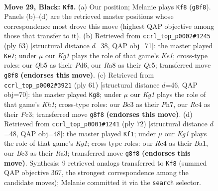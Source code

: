 \documentclass[11pt]{article}
\begin{document}
\clearpage

\begin{figure}[p]\centering
\begin{subfigure}{0.46\textwidth}\centering
\resizebox{\linewidth}{!}{%
\newchessgame
\chessboard[
  setfen={r5k1/p7/4p1Q1/pq1p4/2rP2P1/2b5/2P5/3K2R1 b - - 0 29},
  showmover=false,
  pgfstyle=straightmove, color=movearrow, markmove={g8-f8}
]}
\caption{}
\end{subfigure}\hfill
\begin{subfigure}{0.46\textwidth}\centering
\resizebox{\linewidth}{!}{%
\newchessgame
\chessboard[
  setfen={4k1Q1/8/p2p4/1pr1q1p1/6Pb/8/PPP5/1K5R b - - 2 32},
  showmover=false,
  pgfstyle=straightmove, color=movearrow, markmove={e8-e7}
]}
\caption{}
\end{subfigure}
\\[4pt]
\begin{subfigure}{0.46\textwidth}\centering
\resizebox{\linewidth}{!}{%
\newchessgame
\chessboard[
  setfen={3r3k/p1q4p/5Q2/2p1P3/P6P/2pP4/6P1/R3K3 b Q - 0 31},
  showmover=false,
  pgfstyle=straightmove, color=movearrow, markmove={h8-g8}
]}
\caption{}
\end{subfigure}\hfill
\begin{subfigure}{0.46\textwidth}\centering
\resizebox{\linewidth}{!}{%
\newchessgame
\chessboard[
  setfen={1r4k1/6pp/5p2/2p5/2P3q1/R3Pb2/3Q3P/B3R1K1 w - - 0 37},
  showmover=false,
  pgfstyle=straightmove, color=movearrow, markmove={g1-f1}
]}
\caption{}
\end{subfigure}
\caption{\textbf{Move 29, Black: \texttt{Kf8}.} (a) Our position; Melanie plays \texttt{Kf8} (\texttt{g8f8}). Panels (b)--(d) are the retrieved master positions whose correspondence most drove this move (highest QAP objective among those that transfer to it). (b) Retrieved from \texttt{ccrl\_top\_p0002\#1245} (ply 63) [structural distance $d$=38, QAP obj=71]: the master played \texttt{Ke7}; under $\mu$ our \emph{Kg1} plays the role of that game's \emph{Ke1}; cross-type roles: our \emph{Q}b5 as their \emph{P}d6, our \emph{R}a8 as their \emph{Q}e5; transferred move \texttt{g8f8} \textbf{(endorses this move)}. (c) Retrieved from \texttt{ccrl\_top\_p0002\#3921} (ply 61) [structural distance $d$=46, QAP obj=70]: the master played \texttt{Kg8}; under $\mu$ our \emph{Kg1} plays the role of that game's \emph{Kh1}; cross-type roles: our \emph{B}c3 as their \emph{P}h7, our \emph{R}c4 as their \emph{P}c3; transferred move \texttt{g8f8} \textbf{(endorses this move)}. (d) Retrieved from \texttt{ccrl\_top\_p0001\#1241} (ply 72) [structural distance $d$=48, QAP obj=48]: the master played \texttt{Kf1}; under $\mu$ our \emph{Kg1} plays the role of that game's \emph{Kg1}; cross-type roles: our \emph{R}c4 as their \emph{B}a1, our \emph{B}c3 as their \emph{R}a3; transferred move \texttt{g8f8} \textbf{(endorses this move)}. Synthesis: 9 retrieved analogs transferred to \texttt{Kf8} (summed QAP objective 367, the strongest correspondence among the candidate moves); Melanie committed it via the \texttt{search} selector.}
\label{fig:thought-m57}
\end{figure}
\end{document}
